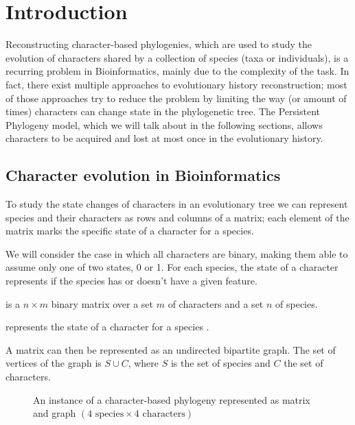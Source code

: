 
\section{Introduction}\label{sec:introduction}

Reconstructing character-based phylogenies, which are used to study the evolution of characters shared by a collection of species (taxa or individuals), is a recurring problem in Bioinformatics, mainly due to the complexity of the task. In fact, there exist multiple approaches to evolutionary history reconstruction; most of those approaches try to reduce the problem by limiting the way (or amount of times) characters can change state in the phylogenetic tree. The Persistent Phylogeny model, which we will talk about in the following sections, allows characters to be acquired and lost at most once in the evolutionary history.

\subsection{Character evolution in Bioinformatics}\label{ssec:charevo}

To study the state changes of characters in an evolutionary tree we can represent species and their characters as rows and columns of a matrix; each element of the matrix marks the specific state of a character for a species.

We will consider the case in which all characters are binary, making them able to assume only one of two states, 0 or 1. For each species, the state of a character represents if the species has or doesn't have a given feature.

\begin{definition}\label{def:m}
  \m{} is a $n \times m$ binary matrix over a set $m$ of characters and a set $n$ of species.

  \m[i][j] represents the state of a character \character[j] for a species \species[i].
\end{definition}

A matrix \m{} can then be represented as an undirected bipartite graph. The set of vertices of the graph is $S \cup C$, where $S$ is the set of species and $C$ the set of characters.

\begin{figure}[h]
  

  \caption{An instance of a character-based phylogeny represented as matrix and graph $(\text{4 species} \times \text{4 characters})$}
  \label{fig:1}
\end{figure}

